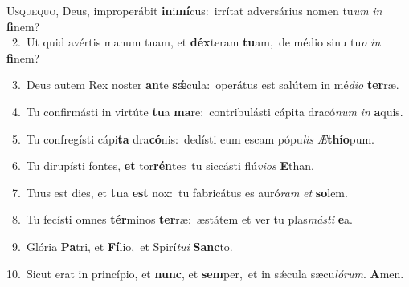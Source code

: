 \lettrine{\initial\textcolor{\initialcolor}{U}}{squequo,} Deus, improperábit \textbf{in}\-i\-\textbf{mí}\-cus:~\star irrítat adversárius nomen tu\textit{um} \textit{in} \textbf{fi}\-nem?\\
{\numbfont\textcolor{\numbcolor}{~2.}}~Ut quid avértis manum tuam, et \textbf{déx}\-teram \textbf{tu}\-am,~\star de médio sinu tu\textit{o} \textit{in} \textbf{fi}\-nem?\par
{\numbfont\textcolor{\numbcolor}{~3.}}~Deus autem Rex noster \textbf{an}\-te \textbf{sǽ}\-cula:~\star operátus est salútem in mé\-\textit{di}\-\textit{o} \textbf{ter}\-ræ.\par
{\numbfont\textcolor{\numbcolor}{~4.}}~Tu confirmásti in virtúte \textbf{tu}\-a \textbf{ma}\-re:~\star contribulásti cápita dracó\textit{num} \textit{in} \textbf{a}\-quis.\par
{\numbfont\textcolor{\numbcolor}{~5.}}~Tu confregísti cápi\textbf{ta} dra\-\textbf{có}\-nis:~\star dedísti eum escam pópu\textit{lis} \textit{Æ}\-\textbf{thí}\textbf{o}pum.\par
{\numbfont\textcolor{\numbcolor}{~6.}}~Tu dirupísti fontes, \textbf{et} tor\-\textbf{rén}\-tes~\star tu siccásti flú\-\textit{vi}\-\textit{os} \textbf{E}\-than.\par
{\numbfont\textcolor{\numbcolor}{~7.}}~Tuus est dies, et \textbf{tu}\-a \textbf{est} nox:~\star tu fabricátus es auró\textit{ram} \textit{et} \textbf{so}\-lem.\par
{\numbfont\textcolor{\numbcolor}{~8.}}~Tu fecísti omnes \textbf{tér}\-minos \textbf{ter}\-ræ:~\star æstátem et ver tu plas\-\textit{más}\-\textit{ti} \textbf{e}\-a.\par
{\numbfont\textcolor{\numbcolor}{~9.}}~Glória \textbf{Pa}\-tri, et \textbf{Fí}\-lio,~\star et Spirí\-\textit{tu}\-\textit{i} \textbf{Sanc}\-to.\par
{\numbfont\textcolor{\numbcolor}{10.}}~Sicut erat in princípio, et \textbf{nunc}\-, et \textbf{sem}\-per,~\star et in sǽcula sæcu\-\textit{ló}\-\textit{rum}. \textbf{A}\-men.\par
